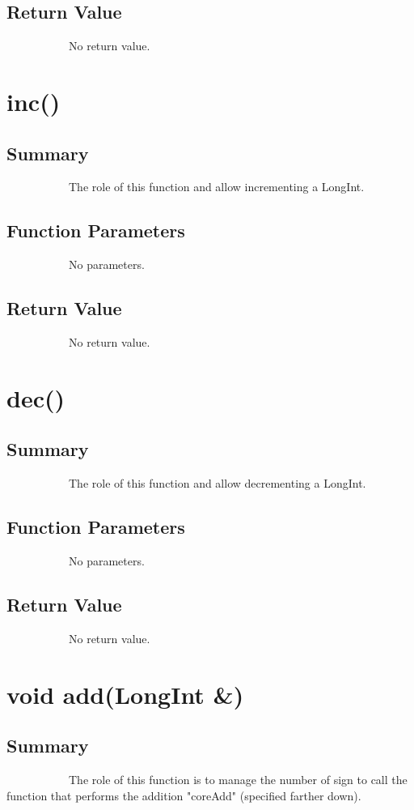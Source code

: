 \documentclass[11pt]{report}
\begin{document}
	\subsection{Return Value}
~~~~~~~~~~~No return value.
	  
    \section{inc()}
    
	\subsection{Summary}
~~~~~~~~~~~The role of this function and allow incrementing a LongInt.
	\subsection{Function Parameters}
~~~~~~~~~~~No parameters.
	\subsection{Return Value}
~~~~~~~~~~~No return value.
	
     \section{dec()}
	\subsection{Summary}
~~~~~~~~~~~The role of this function and allow decrementing a LongInt.
	\subsection{Function Parameters}
~~~~~~~~~~~No parameters. 
	\subsection{Return Value}
~~~~~~~~~~~No return value.

      \section{void add(LongInt \&)}
	\subsection{Summary}
~~~~~~~~~~~The role of this function is to manage the number of sign to call the function that performs the addition "coreAdd" (specified farther down).
\end{document}
